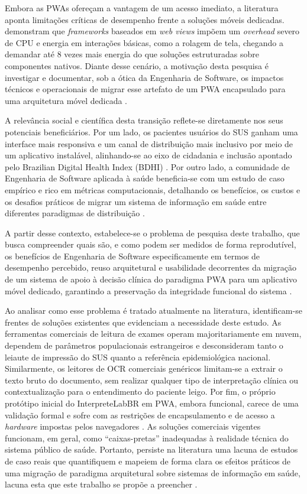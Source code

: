 \documentclass[12pt]{article}
\begin{document}
Embora as PWAs ofereçam a vantagem de um acesso imediato, a literatura
aponta limitações críticas de desempenho frente a soluções móveis
dedicadas. \cite{oliveira2023} demonstram que \textit{frameworks} baseados
em \textit{web views} impõem um \textit{overhead} severo de CPU e energia
em interações básicas, como a rolagem de tela, chegando a demandar até 8
vezes mais energia do que soluções estruturadas sobre componentes nativos.
Diante desse cenário, a motivação desta pesquisa é investigar e
documentar, sob a ótica da Engenharia de Software, os impactos técnicos e
operacionais de migrar esse artefato de um PWA encapsulado para uma
arquitetura móvel dedicada \cite{oliveira2023}.

A relevância social e científica desta transição reflete-se diretamente
nos seus potenciais beneficiários. Por um lado, os pacientes usuários do
SUS ganham uma interface mais responsiva e um canal de distribuição mais
inclusivo por meio de um aplicativo instalável, alinhando-se ao eixo de
cidadania e inclusão apontado pelo Brazilian Digital Health Index (BDHI)
\cite{cruz2022}. Por outro lado, a comunidade de Engenharia de Software
aplicada à saúde beneficia-se com um estudo de caso empírico e rico em
métricas computacionais, detalhando os benefícios, os custos e os desafios
práticos de migrar um sistema de informação em saúde entre diferentes
paradigmas de distribuição \cite{oliveira2023}.

A partir desse contexto, estabelece-se o problema de pesquisa deste
trabalho, que busca compreender quais são, e como podem ser medidos de
forma reprodutível, os benefícios de Engenharia de Software especificamente
em termos de desempenho percebido, reuso arquitetural e usabilidade
decorrentes da migração de um sistema de apoio à decisão clínica do
paradigma PWA para um aplicativo móvel dedicado, garantindo a preservação
da integridade funcional do sistema \cite{rampinelli2026}.

Ao analisar como esse problema é tratado atualmente na literatura,
identificam-se frentes de soluções existentes que evidenciam a necessidade
deste estudo. As ferramentas comerciais de leitura de exames operam
majoritariamente em nuvem, dependem de parâmetros populacionais
estrangeiros e desconsideram tanto o leiaute de impressão do SUS quanto a
referência epidemiológica nacional. Similarmente, os leitores de OCR
comerciais genéricos limitam-se a extrair o texto bruto do documento, sem
realizar qualquer tipo de interpretação clínica ou contextualização para o
entendimento do paciente leigo. Por fim, o próprio protótipo inicial do
InterpreteLabBR em PWA, embora funcional, carece de uma validação formal e
sofre com as restrições de encapsulamento e de acesso a \textit{hardware}
impostas pelos navegadores \cite{cardieri2018}. As soluções comerciais
vigentes funcionam, em geral, como ``caixas-pretas'' inadequadas à
realidade técnica do sistema público de saúde. Portanto, persiste na
literatura uma lacuna de estudos de caso reais que quantifiquem e mapeiem
de forma clara os efeitos práticos de uma migração de paradigma arquitetural
sobre sistemas de informação em saúde, lacuna esta que este trabalho se
propõe a preencher \cite{rampinelli2026}.
\end{document}
